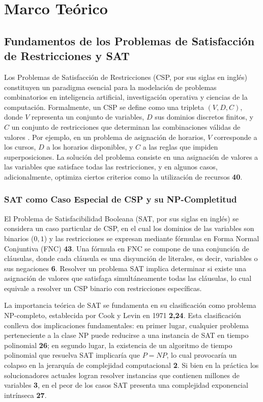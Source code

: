 \chapter{Marco Te\'orico}\label{chapter:state-of-the-art}

\section{Fundamentos de los Problemas de Satisfacci\'on de Restricciones y SAT}
\label{sec:fundamentos-sat-csp}

Los Problemas de Satisfacci\'on de Restricciones (CSP, por sus siglas en ingl\'es) constituyen un paradigma esencial para la modelaci\'on de problemas combinatorios en inteligencia artificial, investigaci\'on operativa y ciencias de la computaci\'on. Formalmente, un CSP se define como una tripleta $(V,D,C)$, donde $V$ representa un conjunto de variables, $D$ sus dominios discretos finitos, y $C$ un conjunto de restricciones que determinan las combinaciones v\'alidas de valores \cite{garcia_conferencia1}. Por ejemplo, en un problema de asignaci\'on de horarios, $V$ corresponde a los cursos, $D$ a los horarios disponibles, y $C$ a las reglas que impiden superposiciones. La soluci\'on del problema consiste en una asignaci\'on de valores a las variables que satisface todas las restricciones, y en algunos casos, adicionalmente, optimiza ciertos criterios como la utilizaci\'on de recursos \textbf{40}.

\subsection{SAT como Caso Especial de CSP y su NP-Completitud}
El Problema de Satisfacibilidad Booleana (SAT, por sus siglas en ingl\'es) se considera un caso particular de CSP, en el cual los dominios de las variables son binarios (${0,1}$) y las restricciones se expresan mediante f\'ormulas en Forma Normal Conjuntiva (FNC) \textbf{43}. Una f\'ormula en FNC se compone de una conjunci\'on de cl\'ausulas, donde cada cl\'ausula es una disyunci\'on de literales, es decir, variables o sus negaciones \textbf{6}. Resolver un problema SAT implica determinar si existe una asignaci\'on de valores que satisfaga simult\'aneamente todas las cl\'ausulas, lo cual equivale a resolver un CSP binario con restricciones espec\'ificas.

La importancia te\'orica de SAT se fundamenta en su clasificaci\'on como problema NP-completo, establecida por Cook y Levin en 1971 \textbf{2,24}. Esta clasificaci\'on conlleva dos implicaciones fundamentales: en primer lugar, cualquier problema perteneciente a la clase NP puede reducirse a una instancia de SAT en tiempo polinomial \textbf{26}; en segundo lugar, la existencia de un algoritmo de tiempo polinomial que resuelva SAT implicar\'ia que $P=NP$, lo cual provocar\'ia un colapso en la jerarqu\'ia de complejidad computacional \textbf{2}. Si bien en la pr\'actica los solucionadores actuales logran resolver instancias que contienen millones de variables \textbf{3}, en el peor de los casos SAT presenta una complejidad exponencial intr\'inseca \textbf{27}.

